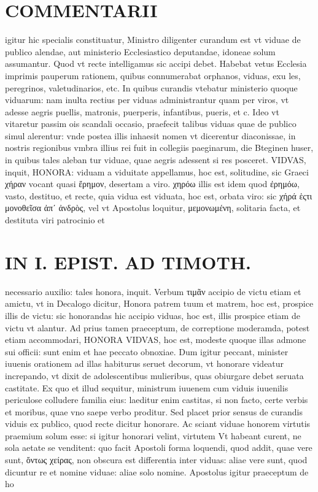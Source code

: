 \documentclass{article}
\begin{document}
\begin{pages}
\section*{COMMENTARII }
\marginpar{[ p.120 ]}\pstart igitur hic specialis constituatur, Ministro diligenter curandum est vt viduae de publico alendae, aut ministerio Ecclesiastico deputandae, idoneae solum assumantur. Quod vt recte intelligamus sic accipi debet. Habebat vetus Ecclesia imprimis pauperum rationem, quibus connumerabat orphanos, viduas, exu les, peregrinos, valetudinarios, etc. In quibus curandis vtebatur ministerio quoque viduarum: nam inulta rectius per viduas administrantur quam per viros, vt adesse aegris puellis, matronis, puerperis, infantibus, pueris, et c. Ideo vt vitaretur passim ois scandali occasio, praefecit talibus viduas quae de publico simul alerentur: vnde postea illis inhaesit nomen vt dicerentur diaconissae, in nostris regionibus vmbra illius rei fuit in collegiis paeginarum, die Bteginen huser, in quibus tales aleban tur viduae, quae aegris adessent si res posceret.  \pend\pstart VIDVAS, inquit, HONORA: viduam a viduitate appellamus, hoc est, solitudine, sic Graeci χήραν vocant quasi ἔρημον, desertam a viro. χηρόω illis est idem quod ἐρημόω, vasto, destituo, et recte, quia vidua est viduata, hoc est, orbata viro: sic χήρά ἑςτι  μονοθεῖσα ἀπʹ ἀνδρὸς, vel vt Apostolus loquitur, μεμονωμένη, solitaria facta, et destituta viri patrocinio et  \pend
\section*{IN I. EPIST. AD TIMOTH. }
\marginpar{[ p.121 ]}\pstart necessario auxilio: tales honora, inquit. Verbum τιμᾶν accipio de victu etiam et amictu, vt in Decalogo dicitur, Honora patrem tuum et matrem, hoc est, prospice illis de victu: sic honorandas hic accipio viduas, hoc est, illis prospice etiam de victu vt alantur. Ad prius tamen praeceptum, de correptione moderamda, potest etiam accommodari, HONORA VIDVAS, hoc est, modeste quoque illas admone sui officii: sunt enim et hae peccato obnoxiae. Dum igitur peccant, minister iuuenis orationem ad illas habiturus seruet decorum, vt honorare videatur increpando, vt dixit de adolescentibus mulieribus, quas obiurgare debet seruata castitate. Ex quo et illud sequitur, ministrum iuuenem cum viduis iuuenilis periculose colludere familia eius: laeditur enim castitas, si non facto, certe verbis et moribus, quae vno saepe verbo proditur.  \pend\pstart Sed placet prior sensus de curandis viduis ex publico, quod recte dicitur honorare. Ac sciant viduae honorem virtutis praemium solum esse: si igitur honorari velint, virtutem Vt habeant curent, ne sola aetate se venditent: quo facit Apostoli forma loquendi, quod addit, quae vere sunt, ὄντως χείρας, non obscura est differentia inter viduas: aliae vere sunt, quod dicuntur re et nomine viduae: aliae solo nomine. Apostolus igitur praeceptum de ho\pend

\end{pages}
\end{document}
